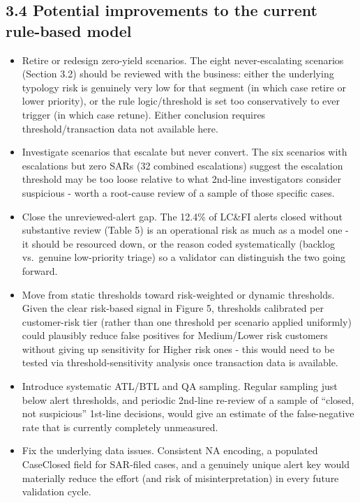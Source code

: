 \documentclass[
]{article}
\begin{document}
\subsection{3.4 Potential improvements to the current rule-based
model}\label{potential-improvements-to-the-current-rule-based-model}

\begin{itemize}
\item
  Retire or redesign zero-yield scenarios. The eight never-escalating
  scenarios (Section 3.2) should be reviewed with the business: either
  the underlying typology risk is genuinely very low for that segment
  (in which case retire or lower priority), or the rule logic/threshold
  is set too conservatively to ever trigger (in which case retune).
  Either conclusion requires threshold/transaction data not available
  here.
\item
  Investigate scenarios that escalate but never convert. The six
  scenarios with escalations but zero SARs (32 combined escalations)
  suggest the escalation threshold may be too loose relative to what
  2nd-line investigators consider suspicious - worth a root-cause review
  of a sample of those specific cases.
\item
  Close the unreviewed-alert gap. The 12.4\% of LC\&FI alerts closed
  without substantive review (Table 5) is an operational risk as much as
  a model one - it should be resourced down, or the reason coded
  systematically (backlog vs.~genuine low-priority triage) so a
  validator can distinguish the two going forward.
\item
  Move from static thresholds toward risk-weighted or dynamic
  thresholds. Given the clear risk-based signal in Figure 5, thresholds
  calibrated per customer-risk tier (rather than one threshold per
  scenario applied uniformly) could plausibly reduce false positives for
  Medium/Lower risk customers without giving up sensitivity for Higher
  risk ones - this would need to be tested via threshold-sensitivity
  analysis once transaction data is available.
\item
  Introduce systematic ATL/BTL and QA sampling. Regular sampling just
  below alert thresholds, and periodic 2nd-line re-review of a sample of
  ``closed, not suspicious'' 1st-line decisions, would give an estimate
  of the false-negative rate that is currently completely unmeasured.
\item
  Fix the underlying data issues. Consistent NA encoding, a populated
  CaseClosed field for SAR-filed cases, and a genuinely unique alert key
  would materially reduce the effort (and risk of misinterpretation) in
  every future validation cycle.
\end{itemize}
\end{document}
